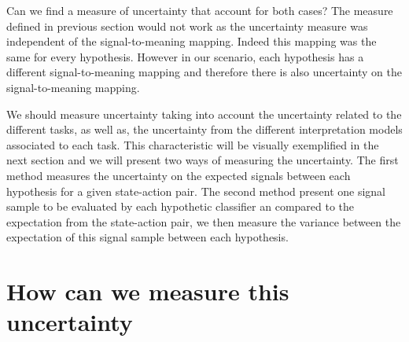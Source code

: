 Can we find a measure of uncertainty that account for both cases? The measure defined in previous section would not work as the uncertainty measure was independent of the signal-to-meaning mapping. Indeed this mapping was the same for every hypothesis. However in our scenario, each hypothesis has a different signal-to-meaning mapping and therefore there is also uncertainty on the signal-to-meaning mapping.


We should measure uncertainty taking into account the uncertainty related to the different tasks, as well as, the uncertainty from the different interpretation models associated to each task. This characteristic will be visually exemplified in the next section and we will present two ways of measuring the uncertainty. The first method measures the uncertainty on the expected signals between each hypothesis for a given state-action pair. The second method present one signal sample to be evaluated by each hypothetic classifier an compared to the expectation from the state-action pair, we then measure the variance between the expectation of this signal sample between each hypothesis.


\section{How can we measure this uncertainty}
\label{chapter:planning:how}

